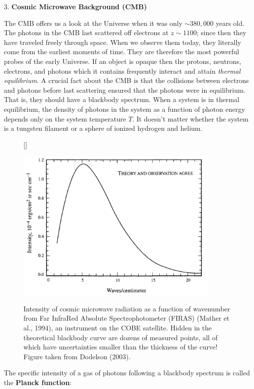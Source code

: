 \documentclass[a4paper,11pt]{article}
\begin{document}
{\noindent}3. \textbf{Cosmic Microwave Background (CMB)}

{\noindent}The CMB offers us a look at the Universe when it was only $\sim 380,000$ years old. The photons in the CMB last scattered off electrons at $z \sim 1100$; since then they have traveled freely through space. When we observe them today, they literally come from the earliest moments of time. They are therefore the most powerful probes of the early Universe. If an object is opaque then the protons, neutrons, electrons, and photons which it contains frequently interact and attain \textit{thermal equilibrium}. A crucial fact about the CMB is that the collisions between electrons and photons before last scattering ensured that the photons were in equilibrium. That is, they should have a blackbody spectrum. When a system is in thermal equilibrium, the density of photons in the system as a function of photon energy depends only on the system temperature $T$. It doesn't matter whether the system is a tungsten filament or a sphere of ionized hydrogen and helium.

\begin{figure}[h]
    [\FBwidth]
    {\caption{\footnotesize{Intensity of cosmic microwave radiation as a function of wavenumber from Far InfraRed Absolute Spectrophotometer (FIRAS) (Mather et al., 1994), an instrument on the COBE satellite. Hidden in the theoretical blackbody curve are dozens of measured points, all of which have uncertainties smaller than the thickness of the curve! Figure taken from Dodelson (2003).}}
    \label{fig:cmb_cobe}}
    {\includegraphics[width=10cm]{figures/CMB_COBE.png}}
\end{figure}

{\noindent}The specific intensity of a gas of photons following a blackbody spectrum is called the \textbf{Planck function}:
\end{document}
